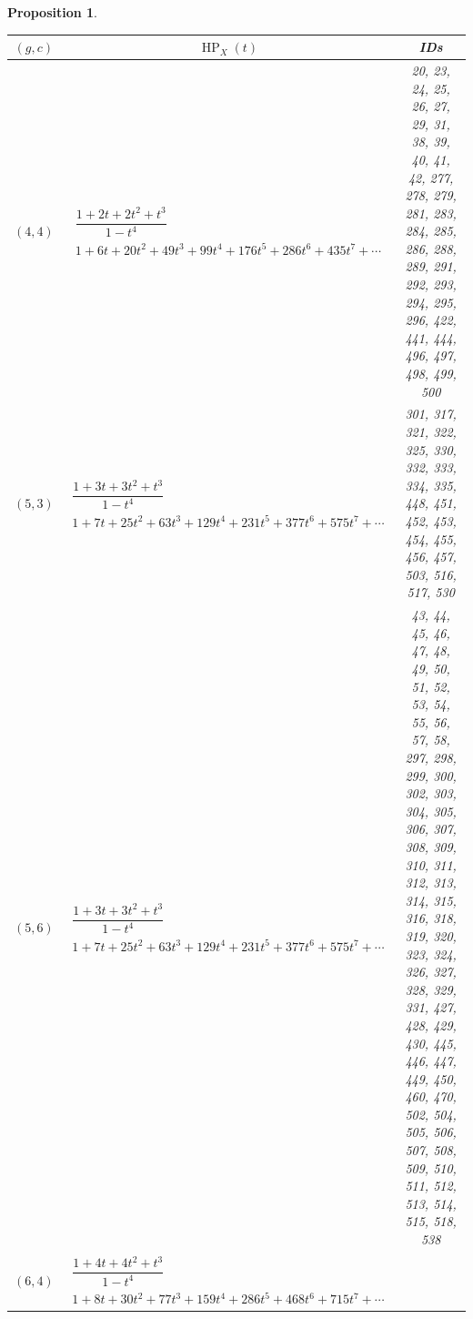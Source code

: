 \documentclass[pdftex]{sigma}%
\newtheorem{prop}[thm]{Proposition}
\theoremstyle{definition}
\DeclareMathOperator\HP{HP}
\numberwithin{equation}{section}
\begin{document}
\begin{prop}
\begin{table}[h!]\centering\setlength{\tabcolsep}{4.5pt}
\renewcommand{\arraystretch}{1.3}\small\tabulinesep=1mm
\begin{tabu}{c|c|c}\hline
 $(g,c)$ & $\HP_X(t)$ & {\rm IDs}
 \\
 \hline
	$(4,4)$\label{T(4,4)}
	&
	$\begin{array}{c}
	 \dfrac{1+2t+2t^2+t^3}{1-t^4} \\[3pt]
	 {1+6t+20t^2+49t^3+99t^4+176t^5+286t^6+435t^7+\cdots}
	\end{array}$
	&
	 \begin{minipage}{4cm}
 \rm
 	20, 23, 24, 25, 26, 27, 29, 31, 38, 39,
 	40, 41, 42, 277, 278, 279, 281, 283, 284, 285,
	 286, 288, 289, 291, 292, 293, 294, 295, 296, 422,
	 441, 444, 496, 497, 498, 499, 500
 \end{minipage}
	\\ \hline
	$(5,3)$\label{T(3,5)}
	&
	$\begin{array}{c}
	 \dfrac{1+3t+3t^2+t^3}{1-t^4} \\[3pt]
	 {1+7t+25t^2+63t^3+129t^4+231t^5+377t^6+575t^7+\cdots}
	\end{array}$
	&
	 \begin{minipage}{4cm}
 \rm
 301, 317, 321, 322, 325, 330, 332, 333, 334, 335,
	 448, 451, 452, 453, 454, 455, 456, 457, 503, 516,
	 517, 530
 \end{minipage}
	\\ \hline
	$(5,6)$\label{T(6,5)}
	&
	$\begin{array}{c}
	 \dfrac{1+3t+3t^2+t^3}{1-t^4} \\[15pt]
	 {1+7t+25t^2+63t^3+129t^4+231t^5+377t^6+575t^7+\cdots}
	\end{array}$
	&
	 \begin{minipage}{4cm}
 \rm
 	43, 44, 45, 46, 47, 48, 49, 50, 51, 52,
	 53, 54, 55, 56, 57, 58, 297, 298, 299, 300,
	 302, 303, 304, 305, 306, 307, 308, 309, 310, 311,
	 312, 313, 314, 315, 316, 318, 319, 320, 323, 324,
	 326, 327, 328, 329, 331, 427, 428, 429, 430, 445,
	 446, 447, 449, 450, 460, 470, 502, 504, 505, 506,
	 507, 508, 509, 510, 511, 512, 513, 514, 515, 518,
	 538
 \end{minipage}
	\\ \hline
	$(6,4)$\label{T(4,6)}
	&
	$\begin{array}{c}
	 \dfrac{1+4t+4t^2+t^3}{1-t^4} \\[3pt]
	 {1+8t+30t^2+77t^3+159t^4+286t^5+468t^6+715t^7+\cdots}
	\end{array}$
	&
	 \begin{minipage}{4cm}

\end{minipage}
\end{tabu}
\end{table}
\end{prop}
\end{document}
